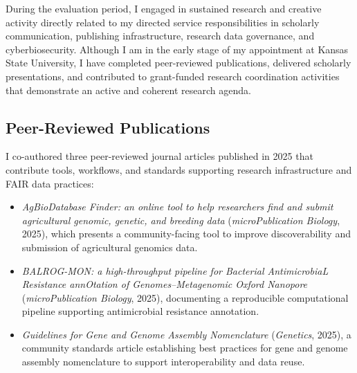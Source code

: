 \ExampleNote

During the evaluation period, I engaged in sustained research and creative activity directly related to my directed service responsibilities in scholarly communication, publishing infrastructure, research data governance, and cyberbiosecurity. Although I am in the early stage of my appointment at Kansas State University, I have completed peer-reviewed publications, delivered scholarly presentations, and contributed to grant-funded research coordination activities that demonstrate an active and coherent research agenda.

\subsection*{Peer-Reviewed Publications}

I co-authored three peer-reviewed journal articles published in 2025 that contribute tools, workflows, and standards supporting research infrastructure and FAIR data practices:

\begin{itemize}
  \item \textit{AgBioDatabase Finder: an online tool to help researchers find and submit agricultural genomic, genetic, and breeding data} (\textit{microPublication Biology}, 2025), which presents a community-facing tool to improve discoverability and submission of agricultural genomics data.

  \item \textit{BALROG-MON: a high-throughput pipeline for Bacterial AntimicrobiaL Resistance annOtation of Genomes--Metagenomic Oxford Nanopore} (\textit{microPublication Biology}, 2025), documenting a reproducible computational pipeline supporting antimicrobial resistance annotation.

  \item \textit{Guidelines for Gene and Genome Assembly Nomenclature} (\textit{Genetics}, 2025), a community standards article establishing best practices for gene and genome assembly nomenclature to support interoperability and data reuse.
\end{itemize}

